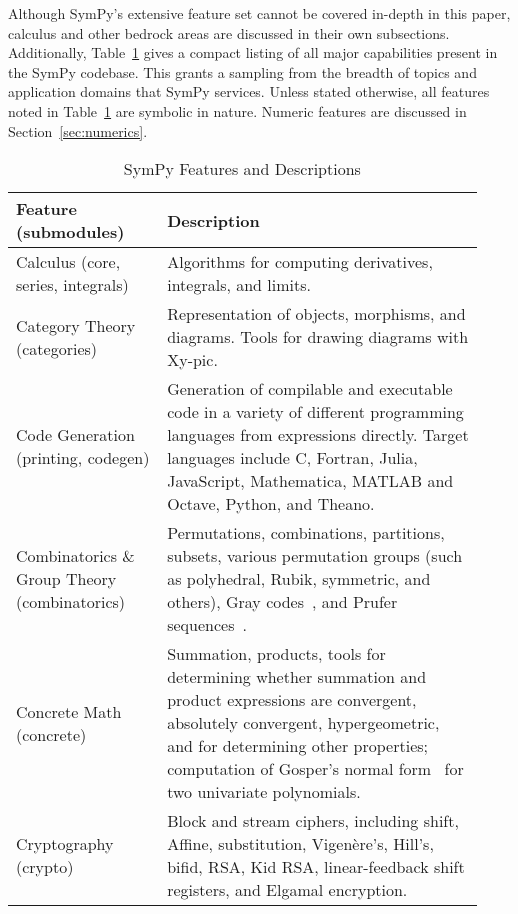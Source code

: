 
Although SymPy's extensive feature set cannot be covered in-depth in this paper,
calculus and other bedrock areas are discussed in their own subsections.
Additionally,
Table~\ref{features-table} gives a compact listing of all major capabilities
present in the SymPy codebase. This grants a sampling from the breadth of
topics and application domains that SymPy services. Unless stated otherwise,
all features noted in Table~\ref{features-table} are symbolic in nature.
Numeric features are discussed in Section~\ref{sec:numerics}.

\begin{longtable}[htbc]{p{0.30\linewidth}p{0.63\linewidth}}
\caption{SymPy Features and Descriptions\label{features-table}}\\
\toprule
\textbf{Feature (submodules)} & \textbf{Description} \\
\midrule
Calculus (core, series, integrals) & Algorithms for computing derivatives, integrals, and limits.\\

Category Theory (categories) & Representation of objects, morphisms, and diagrams. Tools
for drawing diagrams with Xy-pic.\\

Code Generation (printing, codegen) & Generation of compilable and executable code in a
variety of different programming languages from expressions directly. Target
languages include C, Fortran, Julia, JavaScript,
Mathematica, MATLAB and Octave, Python, and Theano.\\

Combinatorics \& Group Theory (combinatorics) & Permutations, combinations,
partitions, subsets, various permutation groups (such as polyhedral, Rubik,
symmetric, and others), Gray codes~\cite{Nijenhuis1978combinatorial},
and Prufer sequences~\cite{biggs1976graph}.\\

Concrete Math (concrete) & Summation, products, tools for determining whether summation
and product expressions are convergent, absolutely convergent, hypergeometric,
and for determining other properties; computation of Gosper's normal form~\cite{petkovvsek1996bak} for two univariate polynomials.\\

Cryptography (crypto) & Block and stream ciphers, including shift, Affine,
substitution, Vigen\`{e}re's, Hill's, bifid, RSA, Kid RSA,
linear-feedback shift registers, and Elgamal encryption.\\


\end{longtable}
